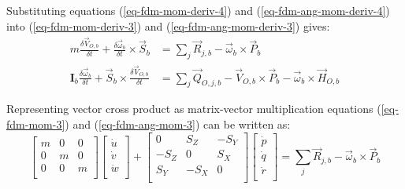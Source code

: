 Substituting equations (\ref{eq-fdm-mom-deriv-4}) and (\ref{eq-fdm-ang-mom-deriv-4}) into (\ref{eq-fdm-mom-deriv-3}) and (\ref{eq-fdm-ang-mom-deriv-3}) gives:
\begin{align}
  \label{eq-fdm-mom-3}
  m \frac{\delta {\vec V}_{O,b}}{\delta t}
  +
  \frac{\delta {\vec \omega}_b}{\delta t} \times {\vec S}_b
  &=
  \sum_{j} {\vec R}_{j,b}
  -
  {\vec \omega}_b \times {\vec P}_b \\
  \label{eq-fdm-ang-mom-3}
  {\boldsymbol I}_b \frac{\delta {\vec \omega}_b}{\delta t}
  +
  {\vec S}_b \times \frac{\delta {\vec V}_{O,b}}{\delta t}
  &=
  \sum_{j} {\vec Q}_{O,j,b}
  -
  {\vec V}_{O,b} \times {\vec P}_b
  -
  {\vec \omega}_b \times {\vec H}_{O,b}
\end{align}

Representing vector cross product as matrix-vector multiplication equations (\ref{eq-fdm-mom-3}) and (\ref{eq-fdm-ang-mom-3}) can be written as:
\begin{equation}
  \label{eq-fdm-mom-4}
  \left[
    \begin{matrix}
      m & 0 & 0 \\
      0 & m & 0 \\
      0 & 0 & m \\
    \end{matrix}
  \right]
  \left[
    \begin{matrix}
      \dot u \\
      \dot v \\
      \dot w \\
    \end{matrix}
  \right]
  +
  \left[
    \begin{matrix}
         0 &  S_Z & -S_Y \\
      -S_Z &    0 &  S_X \\
       S_Y & -S_X &    0 \\
    \end{matrix}
  \right]
  \left[
    \begin{matrix}
      \dot p \\
      \dot q \\
      \dot r \\
    \end{matrix}
  \right]
  =
  \sum_{j} {\vec R}_{j,b} - {\vec \omega}_b \times {\vec P}_b
\end{equation}

